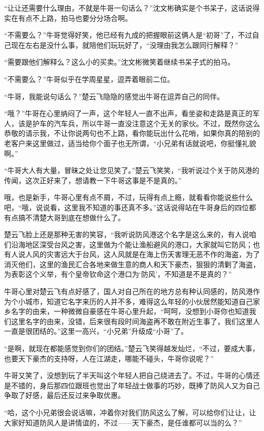 “让让还需要什么理由，不就是牛哥一句话么？”沈文彬确实是个书呆子，这话说得实在有点不上路，拍马也要分分场合啊。

“不需要么？”牛哥觉得好笑，他已经有九成的把握眼前这俩人是“初哥”了，不过自己现在左右是没什么事，就陪他们玩玩好了，“没理由我怎么跟同行解释？”

“需要跟他们解释么？这么小的买卖。”沈文彬微笑着继续书呆子式的拍马。

“不需要么？”牛哥似乎在学周星星，逗弄着眼前二位。

“牛哥，我能说句话么？”楚云飞隐隐的感觉出牛哥在逗弄自己的同伴。

“哦？”牛哥在心里纳闷了一声，这个年轻人一直不出声，看坐姿和走路是真正的军人，该是护车的汽车兵，所以牛哥一直没注意这个无关的家伙。不过，既然你这么恭敬的请示我，不让你说两句也不上路，看你能玩出什么花哨，如果你真的陪别的老客户来这里做过，适当给你个面子也无所谓，“小兄弟有话就说吧，你挺懂礼貌啊。”

“牛哥大人有大量，冒昧之处让您见笑了。”楚云飞笑笑，“我听说过个关于防风港的传闻，这次正好来了，想请教一下牛哥这事是不是真的。”

哦，也是新手，牛哥心里有点不屑，不过，玩得有点上瘾，就看看你能说些什么吧，“哦，说说看，这里我不知道的事还真不多。”这话说得站在牛哥身后的四位都有点搞不清楚大哥到底在想做什么了。

楚云飞脸上还是那种无害的笑容，“我听说防风港这个名字是这么来的，有人说咱们沿海地区深受台风之害，这里做为个能让渔船避风的港口，大家就叫它防风；也有人说人风的灾害远大于台风，这人风就是在海上伤天害理无恶不作的海盗，为了消灭他们，这里的渔民汇合各地来做生意的商人和天下豪杰，狠狠的清剿了海盗，为表彰这个义举，有个皇帝钦命这个港口为‘防风’，不知道是不是真的？”

牛哥心里对楚云飞有点好感了，国人对自己所在的地方总有种认同感的，防风港作为个小城市，知道它名字来历的人并不多，难得这么年轻的小伙居然能知道自己家乡名字的由来，一种微微自豪感在牛哥心里升起，“呵呵，没想到小哥你也知道我们这里名字的由来，没错，后来很有段时间海盗再不敢在附近生事了，我们这里人一直是很团结的。”这里一高兴，“小兄弟”升级成“小哥”了。

“是啊，就现在都能感觉到你们的团结。”楚云飞笑得越发灿烂，“不过，要成大事，也要天下豪杰的支持呀，人在江湖走，哪能不碰头，牛哥你说呢？”

牛哥又笑了，没想到玩了半天叫这个年轻人把自己绕进去了。不过，牛哥的心情还是不错的，身后那四位跟班也觉出了年轻战士做事的巧妙，既捧了防风人又为自己争取了好感，最后还反过来争取优惠。

“哈，这个小兄弟很会说话嘛，冲着你对我们防风这么了解，可以给你们让让，让大家好知道防风人是讲情谊的，不过——天下豪杰，是任谁都可以当的么？”

